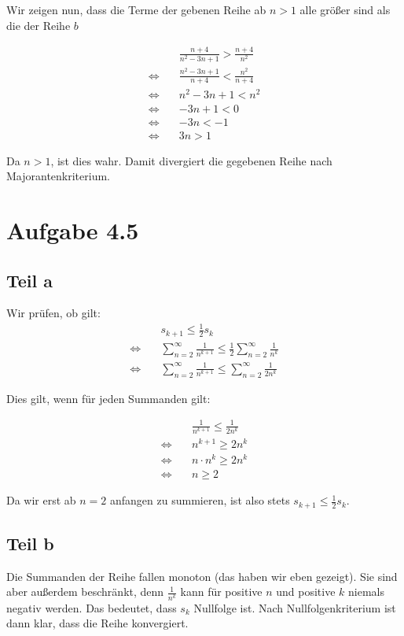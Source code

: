 \documentclass[a4paper,german,12pt,smallheadings]{scrartcl}
\begin{document}
Wir zeigen nun, dass die Terme der gebenen Reihe ab $n > 1$ alle größer sind
als die der Reihe $b$

\begin{align*}
 &\frac{n+4}{n^2-3n+1} > \frac{n+4}{n^2} \\
 \Leftrightarrow\quad& \frac{n^2-3n+1}{n+4} < \frac{n^2}{n+4} \\
 \Leftrightarrow\quad& n^2-3n+1 < n^2 \\
 \Leftrightarrow\quad& -3n+1 < 0 \\
 \Leftrightarrow\quad& -3n < -1 \\
 \Leftrightarrow\quad& 3n > 1
\end{align*}

Da $n > 1$, ist dies wahr. Damit divergiert die gegebenen Reihe nach Majorantenkriterium.

\section*{Aufgabe 4.5}
\subsection*{Teil a}

Wir prüfen, ob gilt:
\begin{align*}
  &s_{k+1} \le \frac{1}{2}s_k \\
  \Leftrightarrow\quad&\sum_{n=2}^{\infty} \frac{1}{n^{k+1}} \le \frac{1}{2} \sum_{n=2}^{\infty} \frac{1}{n^k} \\
  \Leftrightarrow\quad&\sum_{n=2}^{\infty} \frac{1}{n^{k+1}} \le \sum_{n=2}^{\infty} \frac{1}{2n^k}
\end{align*}

Dies gilt, wenn für jeden Summanden gilt:

\begin{align*}
  &\frac{1}{n^{k+1}} \le \frac{1}{2n^k} \\
  \Leftrightarrow\quad& n^{k+1} \ge 2n^k \\
  \Leftrightarrow\quad& n \cdot n^{k} \ge 2n^k \\
  \Leftrightarrow\quad& n \ge 2
\end{align*}

Da wir erst ab $n=2$ anfangen zu summieren, ist also stets $s_{k+1} \le \frac{1}{2}s_k$.

\subsection*{Teil b}
Die Summanden der Reihe fallen monoton (das haben wir eben gezeigt). Sie sind
aber außerdem beschränkt, denn $\frac{1}{n^k}$ kann für positive $n$ und
positive $k$ niemals negativ werden. Das bedeutet, dass $s_k$ Nullfolge ist.
Nach Nullfolgenkriterium ist dann klar, dass die Reihe konvergiert.
\end{document}
